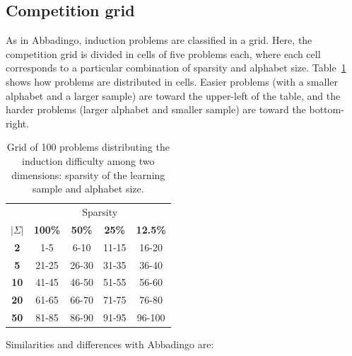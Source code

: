 \subsection{Competition grid}

As in Abbadingo, induction problems are classified in a grid. Here, the competition grid is divided in cells of five problems each, where each cell corresponds to a particular combination of sparsity and alphabet size. Table~\ref{stamina:table:problem-grid} shows how problems are distributed in cells. Easier problems (with a smaller alphabet and a larger sample) are toward the upper-left of the table, and the harder problems (larger alphabet and smaller sample) are toward the bottom-right.

\begin{table}[h]
\begin{center}
\begin{tabular}{c|c c c c}
&\multicolumn{4}{|c}{Sparsity}\\ 
\textbf{$|\Sigma|$} & \textbf{100\%} & \textbf{50\%} & \textbf{25\%} & \textbf{12.5\%}\\
\hline
\textbf{2}  & 1-5   & 6-10  & 11-15 & 16-20 \\
\textbf{5}  & 21-25 & 26-30 & 31-35 & 36-40 \\
\textbf{10} & 41-45 & 46-50 & 51-55 & 56-60 \\
\textbf{20} & 61-65 & 66-70 & 71-75 & 76-80 \\
\textbf{50} & 81-85 & 86-90 & 91-95 & 96-100\\
\end{tabular}
\end{center}
\caption{\label{stamina:table:problem-grid}Grid of 100 problems distributing the induction difficulty among two dimensions: sparsity of the learning sample and alphabet size.}
\end{table}

\noindent Similarities and differences with Abbadingo are:

